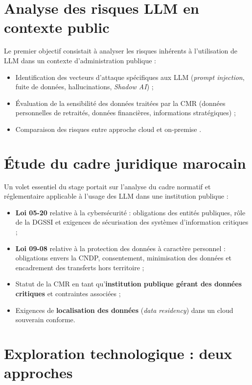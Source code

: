 \documentclass[12pt, a4paper]{report}
\begin{document}
\section{Analyse des risques LLM en contexte public}

Le premier objectif consistait à analyser les risques inhérents à
l'utilisation de LLM dans un contexte d'administration publique :

\begin{itemize}
  \item Identification des vecteurs d'attaque spécifiques aux LLM
        (\textit{prompt injection}, fuite de données, hallucinations,
        \textit{Shadow AI}) ;
  \item Évaluation de la sensibilité des données traitées par la CMR
        (données personnelles de retraités, données financières,
        informations stratégiques) ;
  \item Comparaison des risques entre approche cloud et on-premise .
\end{itemize}

\section{Étude du cadre juridique marocain}

Un volet essentiel du stage portait sur l'analyse du cadre normatif et
réglementaire applicable à l'usage des LLM dans une institution publique :

\begin{itemize}
  \item \textbf{Loi 05-20} relative à la cybersécurité : obligations
        des entités publiques, rôle de la DGSSI et exigences de
        sécurisation des systèmes d'information critiques ;
  \item \textbf{Loi 09-08} relative à la protection des données à
        caractère personnel : obligations envers la CNDP, consentement,
        minimisation des données et encadrement des transferts hors
        territoire ;
  \item Statut de la CMR en tant qu'\textbf{institution publique gérant
        des données critiques} et contraintes associées ;
  \item Exigences de \textbf{localisation des données} (\textit{data
        residency}) dans un cloud souverain conforme.
\end{itemize}

\section{Exploration technologique : deux approches}
\end{document}
